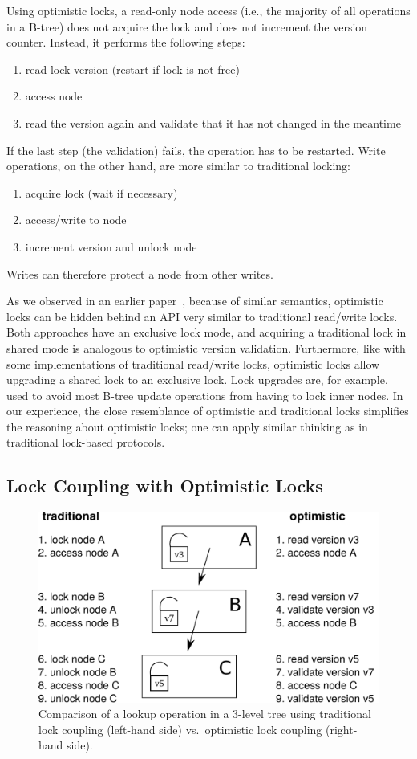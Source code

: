 \documentclass[11pt]{article}
\begin{document}
Using optimistic locks, a read-only node access (i.e., the majority of all operations in a B-tree) does not acquire the lock and does not increment the version counter.
Instead, it performs the following steps:
\begin{enumerate}
\item read lock version (restart if lock is not free)
\item access node
\item read the version again and validate that it has not changed in the meantime
\end{enumerate}
If the last step (the validation) fails, the operation has to be restarted.
Write operations, on the other hand, are more similar to traditional locking:
\begin{enumerate}
\item acquire lock (wait if necessary)
\item access/write to node
\item increment version and unlock node
\end{enumerate}
Writes can therefore protect a node from other writes.

As we observed in an earlier paper~\cite{artsync}, because of similar semantics, optimistic locks can be hidden behind an API very similar to traditional read/write locks.
Both approaches have an exclusive lock mode, and acquiring a traditional lock in shared mode is analogous to optimistic version validation.
Furthermore, like with some implementations of traditional read/write locks, optimistic locks allow upgrading a shared lock to an exclusive lock.
Lock upgrades are, for example, used to avoid most B-tree update operations from having to lock inner nodes.
In our experience, the close resemblance of optimistic and traditional locks simplifies the reasoning about optimistic locks;
one can apply similar thinking as in traditional lock-based protocols.

\subsection{Lock Coupling with Optimistic Locks}

\begin{figure}
  \centering
  \includegraphics[width=0.65\linewidth]{figs/olcall.pdf}
  \vspace{0.2cm}
  \caption{Comparison of a lookup operation in a 3-level tree using traditional lock coupling (left-hand side) vs.~optimistic lock coupling (right-hand side).}
  \label{fig:olc}
\end{figure}
\end{document}
